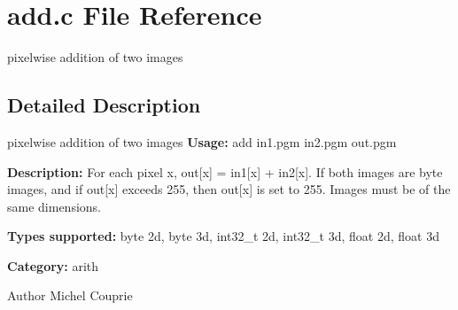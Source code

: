 \section{add.c File Reference}
\label{add_8c}


pixelwise addition of two images  




\subsection{Detailed Description}
pixelwise addition of two images {\bfseries Usage:} add in1.pgm in2.pgm out.pgm

{\bfseries Description:} For each pixel x, out[x] = in1[x] + in2[x]. If both images are byte images, and if out[x] exceeds 255, then out[x] is set to 255. Images must be of the same dimensions.

{\bfseries Types supported:} byte 2d, byte 3d, int32\_\-t 2d, int32\_\-t 3d, float 2d, float 3d

{\bfseries Category:} arith

\begin{DoxyAuthor}{Author}
Michel Couprie 
\end{DoxyAuthor}
